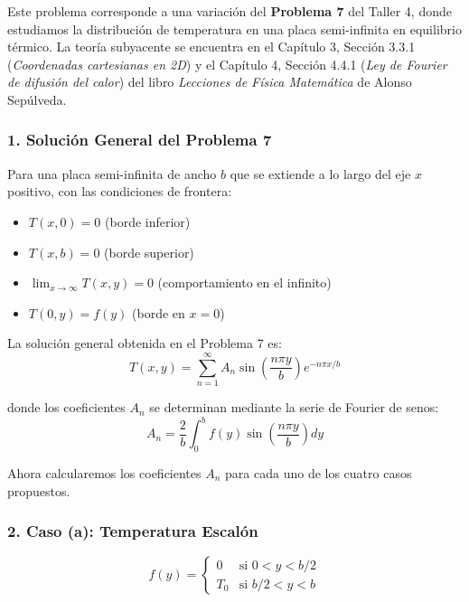 \documentclass[a4paper]{article}
\begin{document}
Este problema corresponde a una variación del \textbf{Problema 7} del Taller 4, donde estudiamos la distribución de temperatura en una placa semi-infinita en equilibrio térmico. La teoría subyacente se encuentra en el Capítulo 3, Sección 3.3.1 (\textit{Coordenadas cartesianas en 2D}) y el Capítulo 4, Sección 4.4.1 (\textit{Ley de Fourier de difusión del calor}) del libro \textit{Lecciones de Física Matemática} de Alonso Sepúlveda.

\subsubsection{1. Solución General del Problema 7}

Para una placa semi-infinita de ancho $b$ que se extiende a lo largo del eje $x$ positivo, con las condiciones de frontera:
\begin{itemize}
    \item $T(x, 0) = 0$ (borde inferior)
    \item $T(x, b) = 0$ (borde superior)
    \item $\lim_{x \to \infty} T(x, y) = 0$ (comportamiento en el infinito)
    \item $T(0, y) = f(y)$ (borde en $x = 0$)
\end{itemize}

La solución general obtenida en el Problema 7 es:
\begin{equation}
T(x, y) = \sum_{n=1}^{\infty} A_n \sin\left(\frac{n\pi y}{b}\right) e^{-n\pi x/b}
\label{eq:solucion_general}
\end{equation}

donde los coeficientes $A_n$ se determinan mediante la serie de Fourier de senos:
\begin{equation}
A_n = \frac{2}{b} \int_0^b f(y) \sin\left(\frac{n\pi y}{b}\right) dy
\label{eq:coeficientes}
\end{equation}

Ahora calcularemos los coeficientes $A_n$ para cada uno de los cuatro casos propuestos.

\subsubsection{2. Caso (a): Temperatura Escalón}

\begin{equation}
f(y) = \begin{cases} 0 & \text{si } 0 < y < b/2 \\ T_0 & \text{si } b/2 < y < b \end{cases}
\end{equation}
\end{document}
